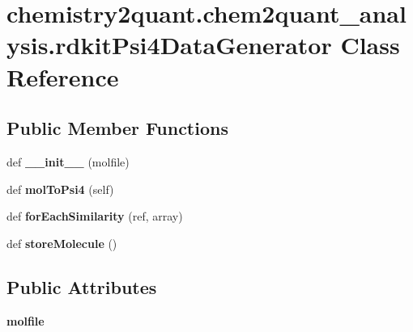 \hypertarget{classchemistry2quant_1_1chem2quant__analysis_1_1rdkitPsi4DataGenerator}{}\section{chemistry2quant.\+chem2quant\+\_\+analysis.\+rdkit\+Psi4\+Data\+Generator Class Reference}
\label{classchemistry2quant_1_1chem2quant__analysis_1_1rdkitPsi4DataGenerator}
\subsection*{Public Member Functions}
\begin{DoxyCompactItemize}
\item
\mbox{\label{classchemistry2quant_1_1chem2quant__analysis_1_1rdkitPsi4DataGenerator_a811506f84f82f5e8609e69c6b10e2bf7}}
def {\bfseries \+\_\+\+\_\+init\+\_\+\+\_\+} (molfile)
\item
\mbox{\label{classchemistry2quant_1_1chem2quant__analysis_1_1rdkitPsi4DataGenerator_a80e36c5df2435112fc52aadf846b8ea5}}
def {\bfseries mol\+To\+Psi4} (self)
\item
\mbox{\label{classchemistry2quant_1_1chem2quant__analysis_1_1rdkitPsi4DataGenerator_ad37d3b84849b3f07d5631b8d42e7af3c}}
def {\bfseries for\+Each\+Similarity} (ref, array)
\item
\mbox{\label{classchemistry2quant_1_1chem2quant__analysis_1_1rdkitPsi4DataGenerator_ad8854a42bbaffbc9a87f55d12a84961a}}
def {\bfseries store\+Molecule} ()
\end{DoxyCompactItemize}
\subsection*{Public Attributes}
\begin{DoxyCompactItemize}
\item
\mbox{\label{classchemistry2quant_1_1chem2quant__analysis_1_1rdkitPsi4DataGenerator_a1606dfd53ac0b1197eed92236e7c91b9}}
{\bfseries molfile}
\end{DoxyCompactItemize}


